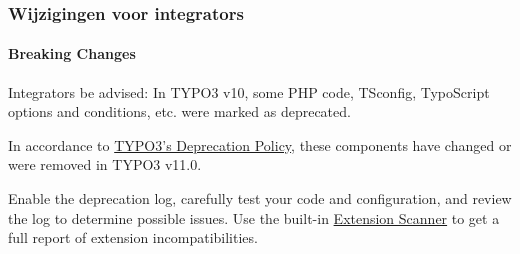 %

\begin{frame}[fragile]
	\frametitle{Wijzigingen voor integrators}
	\framesubtitle{Breaking Changes}

	\small
		Integrators be advised: In TYPO3 v10, some PHP code, TSconfig, TypoScript
		options and conditions, etc. were marked as deprecated.

		\vspace{0.2cm}

		In accordance to
		\href{https://typo3.org/article/typo3-deprecation-policy}{TYPO3's Deprecation Policy},
		these components have changed or were removed in TYPO3 v11.0.

		\vspace{0.2cm}

		Enable the deprecation log, carefully test your code and configuration,
		and review the log to determine possible issues. Use the built-in
		\href{https://docs.typo3.org/m/typo3/reference-coreapi/master/en-us/ApiOverview/ExtensionScanner/Index.html}{Extension Scanner}
		to get a full report of extension incompatibilities.

	\normalsize

\end{frame}


